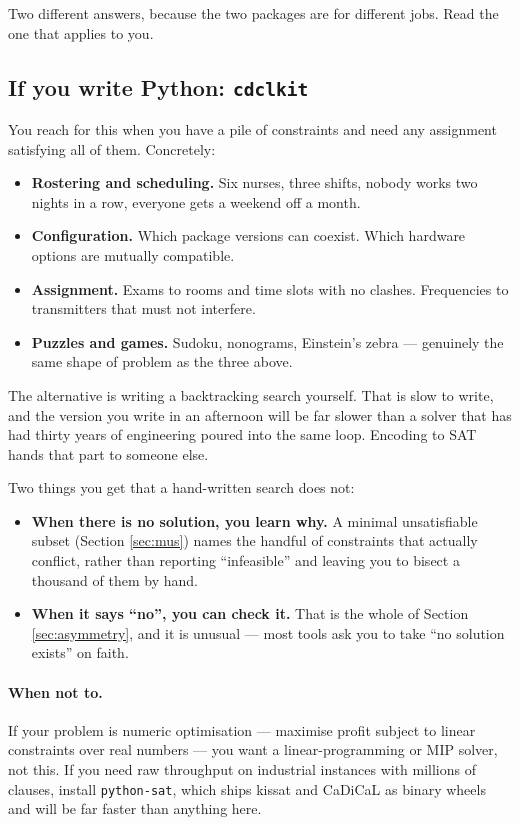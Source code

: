 \documentclass[11pt,a4paper]{article}
\newcommand{\pkg}[1]{\texttt{#1}}
\begin{document}
Two different answers, because the two packages are for different jobs. Read
the one that applies to you.

\subsection*{If you write Python: \pkg{cdclkit}}

You reach for this when you have a pile of constraints and need any assignment
satisfying all of them. Concretely:

\begin{itemize}
\item \textbf{Rostering and scheduling.} Six nurses, three shifts, nobody works
      two nights in a row, everyone gets a weekend off a month.
\item \textbf{Configuration.} Which package versions can coexist. Which
      hardware options are mutually compatible.
\item \textbf{Assignment.} Exams to rooms and time slots with no clashes.
      Frequencies to transmitters that must not interfere.
\item \textbf{Puzzles and games.} Sudoku, nonograms, Einstein's zebra ---
      genuinely the same shape of problem as the three above.
\end{itemize}

The alternative is writing a backtracking search yourself. That is slow to
write, and the version you write in an afternoon will be far slower than a
solver that has had thirty years of engineering poured into the same loop.
Encoding to SAT hands that part to someone else.

Two things you get that a hand-written search does not:

\begin{itemize}
\item \textbf{When there is no solution, you learn why.} A minimal
      unsatisfiable subset (Section \ref{sec:mus}) names the handful of
      constraints that actually conflict, rather than reporting
      ``infeasible'' and leaving you to bisect a thousand of them by hand.
\item \textbf{When it says ``no'', you can check it.} That is the whole of
      Section \ref{sec:asymmetry}, and it is unusual --- most tools ask you to
      take ``no solution exists'' on faith.
\end{itemize}

\paragraph{When not to.} If your problem is numeric optimisation --- maximise
profit subject to linear constraints over real numbers --- you want a
linear-programming or MIP solver, not this. If you need raw throughput on
industrial instances with millions of clauses, install \pkg{python-sat}, which
ships kissat and CaDiCaL as binary wheels and will be far faster than anything
here.
\end{document}
